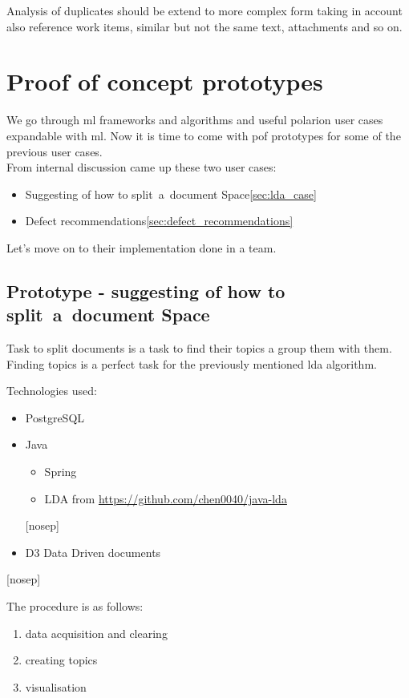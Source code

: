 \documentclass[thesis=M,english]{FITthesis}[2012/06/26]
\begin{document}
Analysis of duplicates should be extend to more complex form taking in account also reference work items, similar but not the same text, attachments and so on.

\chapter{Proof of concept prototypes}

We go through \acrshort{ml} frameworks and algorithms and useful \acrshort{polarion} user cases expandable with \acrshort{ml}. Now it is time to come with \acrshort{pof} prototypes for some of the previous user cases.\\

From internal discussion came up these two user cases:
\begin{itemize}[nosep]
\item Suggesting of how to split a document Space\ref{sec:lda_case}
\item Defect recommendations\ref{sec:defect_recommendations}
\end{itemize}

Let's move on to their implementation done in a team.

\section{Prototype - suggesting of how to split a document Space}

Task to split documents is a task to find their topics a group them with them. Finding topics is a perfect task for the previously mentioned \acrshort{lda}\cite{lda_algotithm} algorithm. 

Technologies used:
\begin{itemize}[nosep]
	\item PostgreSQL
	\item Java
	\begin{itemize}[nosep]
		\item Spring
		\item LDA from \url{https://github.com/chen0040/java-lda}
	\end{itemize}[nosep]
	\item D3 Data Driven documents\cite{d3}
\end{itemize}[nosep]

The procedure is as follows:
\begin{enumerate}[nosep]
\item data acquisition and clearing
\item creating topics
\item visualisation\\
\end{enumerate}
\end{document}
